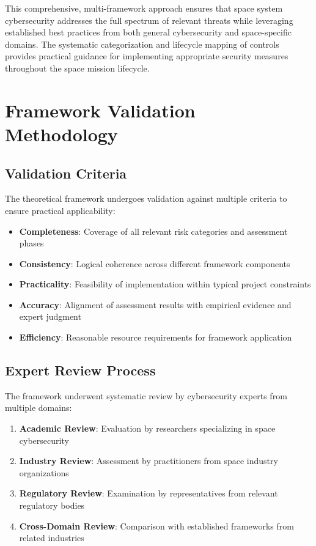 \documentclass[binding=0.6cm]{sapthesis}
\begin{document}
This comprehensive, multi-framework approach ensures that space system cybersecurity addresses the full spectrum of relevant threats while leveraging established best practices from both general cybersecurity and space-specific domains. The systematic categorization and lifecycle mapping of controls provides practical guidance for implementing appropriate security measures throughout the space mission lifecycle.

\section{Framework Validation Methodology}

\subsection{Validation Criteria}

The theoretical framework undergoes validation against multiple criteria to ensure practical applicability:

\begin{itemize}
    \item \textbf{Completeness}: Coverage of all relevant risk categories and assessment phases
    \item \textbf{Consistency}: Logical coherence across different framework components
    \item \textbf{Practicality}: Feasibility of implementation within typical project constraints
    \item \textbf{Accuracy}: Alignment of assessment results with empirical evidence and expert judgment
    \item \textbf{Efficiency}: Reasonable resource requirements for framework application
\end{itemize}

\subsection{Expert Review Process}

The framework underwent systematic review by cybersecurity experts from multiple domains:

\begin{enumerate}
    \item \textbf{Academic Review}: Evaluation by researchers specializing in space cybersecurity
    \item \textbf{Industry Review}: Assessment by practitioners from space industry organizations
    \item \textbf{Regulatory Review}: Examination by representatives from relevant regulatory bodies
    \item \textbf{Cross-Domain Review}: Comparison with established frameworks from related industries
\end{enumerate}
\end{document}

